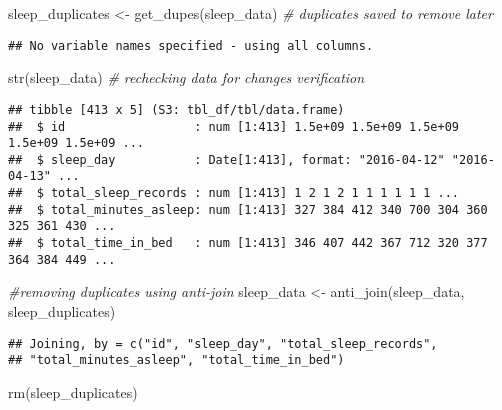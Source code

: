 \documentclass[
]{article}
\newenvironment{Shaded}{\begin{snugshade}}{\end{snugshade}}
\newcommand{\CommentTok}[1]{\textcolor[rgb]{0.56,0.35,0.01}{\textit{#1}}}
\newcommand{\FunctionTok}[1]{\textcolor[rgb]{0.00,0.00,0.00}{#1}}
\newcommand{\NormalTok}[1]{#1}
\newcommand{\OtherTok}[1]{\textcolor[rgb]{0.56,0.35,0.01}{#1}}
\begin{document}
\begin{Shaded}
\begin{Highlighting}[]
\NormalTok{ sleep\_duplicates }\OtherTok{\textless{}{-}} \FunctionTok{get\_dupes}\NormalTok{(sleep\_data) }\CommentTok{\# duplicates saved to remove later}
\end{Highlighting}
\end{Shaded}

\begin{verbatim}
## No variable names specified - using all columns.
\end{verbatim}

\begin{Shaded}
\begin{Highlighting}[]
 \FunctionTok{str}\NormalTok{(sleep\_data) }\CommentTok{\# rechecking data for changes verification}
\end{Highlighting}
\end{Shaded}

\begin{verbatim}
## tibble [413 x 5] (S3: tbl_df/tbl/data.frame)
##  $ id                  : num [1:413] 1.5e+09 1.5e+09 1.5e+09 1.5e+09 1.5e+09 ...
##  $ sleep_day           : Date[1:413], format: "2016-04-12" "2016-04-13" ...
##  $ total_sleep_records : num [1:413] 1 2 1 2 1 1 1 1 1 1 ...
##  $ total_minutes_asleep: num [1:413] 327 384 412 340 700 304 360 325 361 430 ...
##  $ total_time_in_bed   : num [1:413] 346 407 442 367 712 320 377 364 384 449 ...
\end{verbatim}

\begin{Shaded}
\begin{Highlighting}[]
 \CommentTok{\#removing duplicates using anti{-}join}
\NormalTok{ sleep\_data }\OtherTok{\textless{}{-}} \FunctionTok{anti\_join}\NormalTok{(sleep\_data, sleep\_duplicates)}
\end{Highlighting}
\end{Shaded}

\begin{verbatim}
## Joining, by = c("id", "sleep_day", "total_sleep_records",
## "total_minutes_asleep", "total_time_in_bed")
\end{verbatim}

\begin{Shaded}
\begin{Highlighting}[]
 \FunctionTok{rm}\NormalTok{(sleep\_duplicates)}
\end{Highlighting}
\end{Shaded}
\end{document}
